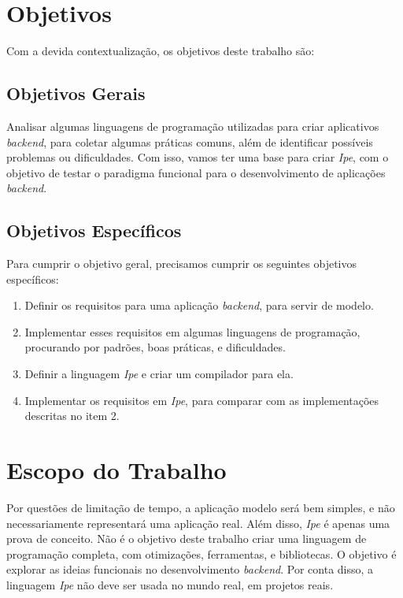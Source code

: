 \section{Objetivos}

Com a devida contextualização, os objetivos deste trabalho são:

\subsection{Objetivos Gerais}

Analisar algumas linguagens de programação utilizadas para criar aplicativos
\textit{backend}, para coletar algumas práticas comuns, além de identificar
possíveis problemas ou dificuldades. Com isso, vamos ter uma base
para criar \textit{Ipe}, com o objetivo de testar o paradigma funcional para o
desenvolvimento de aplicações \textit{backend}.

\subsection{Objetivos Específicos}

Para cumprir o objetivo geral, precisamos cumprir os seguintes objetivos específicos:

\begin{enumerate}
      \item Definir os requisitos para uma aplicação \textit{backend}, para servir
            de modelo.
      \item Implementar esses requisitos em algumas linguagens de programação,
            procurando por padrões, boas práticas, e dificuldades.
      \item Definir a linguagem \textit{Ipe} e criar um compilador para ela.
      \item Implementar os requisitos em \textit{Ipe}, para comparar com as
            implementações descritas no item 2.
\end{enumerate}


\section{Escopo do Trabalho}

Por questões de limitação de tempo, a aplicação modelo será bem simples, e não
necessariamente representará uma aplicação real. Além disso, \textit{Ipe} é apenas
uma prova de conceito. Não é o objetivo deste trabalho criar uma linguagem de
programação completa, com otimizações, ferramentas, e bibliotecas. O objetivo é
explorar as ideias funcionais no desenvolvimento \textit{backend}. Por conta disso,
a linguagem \textit{Ipe} não deve ser usada no mundo real, em projetos reais.

